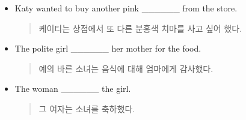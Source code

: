 \documentclass{article}
\begin{document}
\begin{addmargin}[1em]{1em}
\begin{itemize}
    \item Katy wanted to buy another pink \_\_\_\_\_\_ from the store.
    \begin{quote}
    케이티는 상점에서 또 다른 분홍색 치마를 사고 싶어 했다.
    \end{quote}
    \item The polite girl \_\_\_\_\_\_ her mother for the food.
    \begin{quote}
    예의 바른 소녀는 음식에 대해 엄마에게 감사했다.
    \end{quote}
    \item The woman \_\_\_\_\_\_ the girl.
    \begin{quote}
    그 여자는 소녀를 축하했다.
    \end{quote}
\end{itemize}
\end{addmargin}
\end{document}
